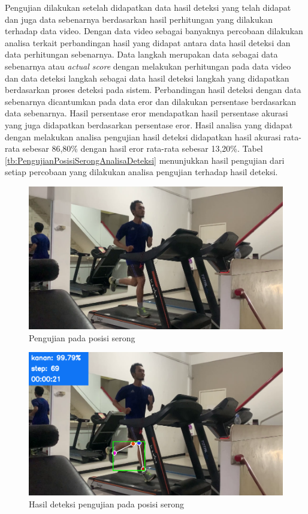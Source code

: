 Pengujian dilakukan setelah didapatkan data hasil deteksi yang telah didapat dan juga data sebenarnya berdasarkan hasil perhitungan yang dilakukan terhadap data video. Dengan data video sebagai banyaknya percobaan dilakukan analisa terkait perbandingan hasil yang didapat antara data hasil deteksi dan data perhitungan sebenarnya. Data langkah merupakan data sebagai data sebenarnya atau \emph{actual score} dengan melakukan perhitungan pada data video dan data deteksi langkah sebagai data hasil deteksi langkah yang didapatkan berdasarkan proses deteksi pada sistem. Perbandingan hasil deteksi dengan data sebenarnya dicantumkan pada data eror dan dilakukan persentase berdasarkan data sebenarnya. Hasil persentase eror mendapatkan hasil persentase akurasi yang juga didapatkan berdasarkan persentase eror. Hasil analisa yang didapat dengan melakukan analisa pengujian hasil deteksi didapatkan hasil akurasi rata-rata sebesar 86,80\% dengan hasil eror rata-rata sebesar 13,20\%. Tabel \ref{tb:PengujianPosisiSerongAnalisaDeteksi} menunjukkan hasil pengujian dari setiap percobaan yang dilakukan analisa pengujian terhadap hasil deteksi.

\begin{figure}[H]
  \centering
  \includegraphics[scale=0.55]{gambar/posisi_serong.png}
  \caption{Pengujian pada posisi serong}
  \label{fig:PengujianPosisiSerong}
\end{figure}

\begin{figure}[H]
  \centering
  \includegraphics[scale=0.55]{gambar/posisi_serong2.png}
  \caption{Hasil deteksi pengujian pada posisi serong}
  \label{fig:PengujianPosisiSerong2}
\end{figure}


